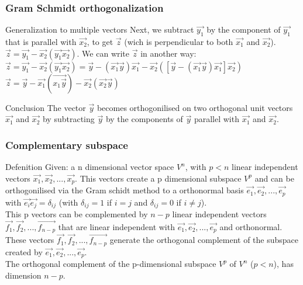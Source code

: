 \begin{frame}
	\frametitle{Gram Schmidt orthogonalization}
	\begin{block}{Generalization to multiple vectors}
		Next, we subtract $\overrightarrow{y_1}$ by the component of $\overrightarrow{y_1}$ that is parallel with $\overrightarrow{x_2}$, to get $\overrightarrow{z}$ (wich is perpendicular to both $\overrightarrow{x_1}$ and $\overrightarrow{x_2}$).\\
		$\overrightarrow{z}=\overrightarrow{y_1}-\overrightarrow{x_2}(\overrightarrow{y_1}\overrightarrow{x_2})$. We can write $\overrightarrow{z}$ in another way:\\
		$\overrightarrow{z}=\overrightarrow{y_1}-\overrightarrow{x_2}(\overrightarrow{y_1}\overrightarrow{x_2})=\overrightarrow{y}-(\overrightarrow{x_1}\overrightarrow{y})\overrightarrow{x_1}-\overrightarrow{x_2}([\overrightarrow{y}-(\overrightarrow{x_1}\overrightarrow{y})\overrightarrow{x_1}]\overrightarrow{x_2})$\\
		$\overrightarrow{z}=\overrightarrow{y}-\overrightarrow{x_1}(\overrightarrow{x_1\overrightarrow{y}})-\overrightarrow{x_2}(\overrightarrow{x_2}\overrightarrow{y})$
	\end{block} 
	\begin{block}{Conclusion}
		The vector $\overrightarrow{y}$ becomes orthogonilised on two orthogonal unit vectors $\overrightarrow{x_1}$ and $\overrightarrow{x_2}$ by subtracting $\overrightarrow{y}$ by the components of $\overrightarrow{y}$ parallel with $\overrightarrow{x_1}$ and $\overrightarrow{x_2}$.
	\end{block}
\end{frame}

\begin{frame}
	\frametitle{Complementary subspace}
	\begin{block}{Defenition}
		Given: a n dimensional vector space $V^n$, with $p<n$ linear independent vectors $\overrightarrow{x_1},\overrightarrow{x_2},...,\overrightarrow{x_p}$. This vectors create a p dimensional subspace $V^p$ and can be orthogonilised via the Gram schidt method to a orthonormal basis $\overrightarrow{e_1},\overrightarrow{e_2},...,\overrightarrow{e_p}$ with $\overrightarrow{e_i}\overrightarrow{e_j}=\delta_{ij}$ (with $\delta_{ij}=1$ if $i=j$ and $\delta_{ij}=0$ if $i\neq j$).\\
		This p vectors can be complemented by $n-p$ linear independent vectors $\overrightarrow{f_1},\overrightarrow{f_2},...,\overrightarrow{f_{n-p}}$ that are linear independent with $\overrightarrow{e_1},\overrightarrow{e_2},...,\overrightarrow{e_p}$ and orthonormal.\\
		\vspace{4mm}
		These vectors $\overrightarrow{f_1},\overrightarrow{f_2},...,\overrightarrow{f_{n-p}}$ generate the orthogonal complement of the subspace created by $\overrightarrow{e_1},\overrightarrow{e_2},...,\overrightarrow{e_p}$. \\
		The orthogonal complement of the p-dimensional subspace $V^p$ of $V^n$ ($p<n$), has dimension $n-p$.
	\end{block}
\end{frame}
					
